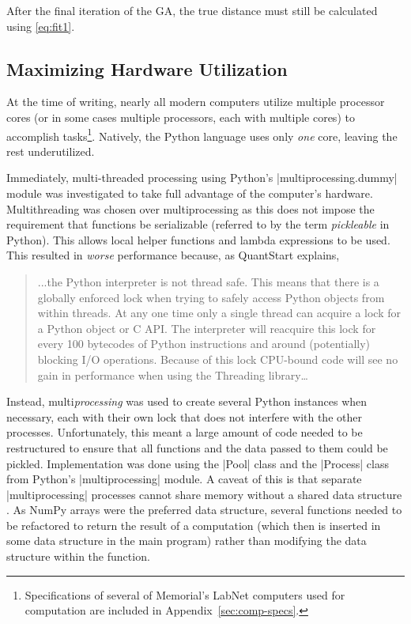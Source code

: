After the final iteration of the GA, the true distance must still be calculated
using \eqref{eq:fit1}.

\subsection{Maximizing Hardware Utilization}
At the time of writing, nearly all modern computers utilize multiple processor
cores (or in some cases multiple processors, each with multiple cores) to 
accomplish tasks\footnote{Specifications of several of Memorial's LabNet 
computers used for computation are included in Appendix~\ref{sec:comp-specs}.}.
Natively, the Python language uses only {\em one} core, leaving the rest 
underutilized. 

Immediately, multi-threaded processing using Python's 
|multiprocessing.dummy| module was investigated to take full 
advantage of the computer's hardware. Multithreading was chosen over
multiprocessing as this does not impose the requirement that functions 
be serializable (referred to by the term {\em pickleable} in Python). This 
allows local helper functions and lambda expressions to be used.
This resulted in {\em worse} performance because, as QuantStart explains,
\begin{quote}
	...the Python interpreter is not thread safe. This means that there is a
	globally enforced lock when trying to safely access Python objects from 
	within threads. At any one time only a single thread can acquire a lock 
	for a Python object or C API. The interpreter will reacquire this lock for 
	every 100 bytecodes of Python instructions and around (potentially) 
	blocking I/O operations. Because of this lock CPU-bound code will see 
	no gain in performance when using the Threading library\ldots
	\cite{quantstart}
\end{quote}
Instead, multi{\em processing} was used to create several Python instances
when necessary, each with their own lock that does not interfere with the
other processes. Unfortunately, this meant a large amount of code needed
to be restructured to ensure that all functions and the data passed to them
could be pickled. Implementation was done using the |Pool| class and the
|Process| class from Python's |multiprocessing| module. A caveat of this 
is that separate |multiprocessing| processes cannot share memory without
a shared data structure \cite{wang}. As NumPy arrays were the preferred data
structure, several functions needed to be refactored to return the result
of a computation (which then is inserted in some data structure in the main 
program) rather than modifying the data structure within the function.

